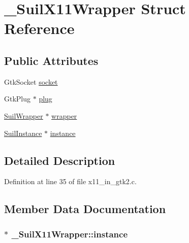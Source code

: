 \hypertarget{struct___suil_x11_wrapper}{}\section{\+\_\+\+Suil\+X11\+Wrapper Struct Reference}
\label{struct___suil_x11_wrapper}
\subsection*{Public Attributes}
\begin{DoxyCompactItemize}
\item 
Gtk\+Socket \hyperlink{struct___suil_x11_wrapper_a829d5369d7deca397e7966dc63051556}{socket}
\item 
Gtk\+Plug $\ast$ \hyperlink{struct___suil_x11_wrapper_a99d6a748bc346bc993e501221e140b36}{plug}
\item 
\hyperlink{suil__internal_8h_ae19f6c4d775c4fc1141e4bfbfd8069cd}{Suil\+Wrapper} $\ast$ \hyperlink{struct___suil_x11_wrapper_afdcc329c36173288f2e6e61914daf7d5}{wrapper}
\item 
\hyperlink{group__suil_ga767e978a8c5f7c0d5246da79c9b97c6b}{Suil\+Instance} $\ast$ \hyperlink{struct___suil_x11_wrapper_a1134a1bd954d99a56e85e4592fb43847}{instance}
\end{DoxyCompactItemize}


\subsection{Detailed Description}


Definition at line 35 of file x11\+\_\+in\+\_\+gtk2.\+c.



\subsection{Member Data Documentation}
\subsubsection[{\texorpdfstring{instance}{instance}}]{$\ast$ \+\_\+\+Suil\+X11\+Wrapper\+::instance}\hypertarget{struct___suil_x11_wrapper_a1134a1bd954d99a56e85e4592fb43847}{}\label{struct___suil_x11_wrapper_a1134a1bd954d99a56e85e4592fb43847}


